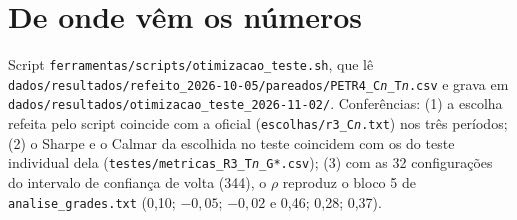 \documentclass[11pt,a4paper]{article}
\begin{document}
\section*{De onde vêm os números}

{\small\sloppy
Script \texttt{ferramentas/scripts/otimizacao\_teste.sh}, que lê
\texttt{dados/resultados/refeito\_2026-10-05/pareados/PETR4\_C\textit{n}\_T\textit{n}.csv} e grava em
\texttt{dados/resultados/otimizacao\_teste\_2026-11-02/}. Conferências: (1) a escolha refeita pelo script
coincide com a oficial (\texttt{escolhas/r3\_C\textit{n}.txt}) nos três períodos; (2) o Sharpe e o Calmar da
escolhida no teste coincidem com os do teste individual dela (\texttt{testes/metricas\_R3\_T\textit{n}\_G*.csv});
(3) com as 32 configurações do intervalo de confiança de volta (344), o $\rho$ reproduz o bloco 5 de
\texttt{analise\_grades.txt} (0,10; $-0{,}05$; $-0{,}02$ e 0,46; 0,28; 0,37).
\par}
\end{document}
